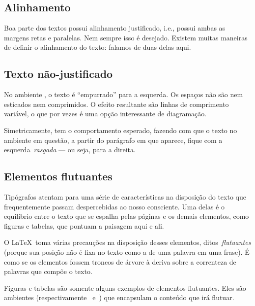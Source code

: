 \subsection{Alinhamento}\label{sec:alinhamento}

Boa parte dos textos possui alinhamento justificado, i.e., possui
ambas as margens retas e paralelas. Nem sempre isso é
desejado. Existem muitas maneiras de definir o alinhamento do texto:
falamos de duas delas aqui.

\subsection{Texto não-justificado}

\begin{flushleft}
No ambiente
, o texto é
``empurrado'' para a esquerda. Os espaços não são nem esticados nem
comprimidos. O efeito resultante são linhas de comprimento variável, o
que por vezes é uma opção interessante de diagramação.
\end{flushleft}

\begin{flushright}
Simetricamente,
 tem o
comportamento esperado, fazendo com que o texto no ambiente em
questão, a partir do parágrafo em que aparece, fique com a
esquerda~\emph{rasgada} --- ou seja, para a direita.
\end{flushright}

\subsection{Elementos flutuantes}\label{sec:floats}

Tipógrafos atentam para uma série de características na disposição do
texto que frequentemente passam despercebidas ao nosso consciente. Uma
delas é o equilíbrio entre o texto que se espalha pelas páginas e os
demais elementos, como figuras e tabelas, que pontuam a paisagem aqui
e ali. 

O \LaTeX\ toma várias precauções na disposição desses elementos,
ditos~\emph{flutuantes} (porque sua posição não é fixa no texto como a
de uma palavra em uma frase). É como se os elementos fossem troncos de
árvore à deriva sobre a correnteza de palavras que compõe o texto.

Figuras e tabelas são somente alguns exemplos de elementos
flutuantes. Eles são ambientes (respectivamente~
e~) que encapsulam o conteúdo que irá flutuar.

